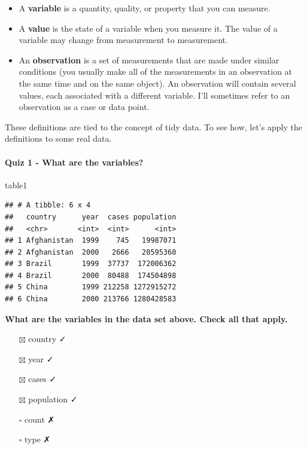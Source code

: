 \documentclass[
]{article}
\newenvironment{Shaded}{\begin{snugshade}}{\end{snugshade}}
\newcommand{\NormalTok}[1]{#1}
\providecommand{\tightlist}{%
  \setlength{\itemsep}{0pt}\setlength{\parskip}{0pt}}
\begin{document}
\begin{itemize}
\item
  A \textbf{variable} is a quantity, quality, or property that you can
  measure.
\item
  A \textbf{value} is the state of a variable when you measure it. The
  value of a variable may change from measurement to measurement.
\item
  An \textbf{observation} is a set of measurements that are made under
  similar conditions (you usually make all of the measurements in an
  observation at the same time and on the same object). An observation
  will contain several values, each associated with a different
  variable. I'll sometimes refer to an observation as a case or data
  point.
\end{itemize}

These definitions are tied to the concept of tidy data. To see how,
let's apply the definitions to some real data.

\hypertarget{quiz-1---what-are-the-variables}{%
\paragraph{Quiz 1 - What are the
variables?}\label{quiz-1---what-are-the-variables}}

\begin{Shaded}
\begin{Highlighting}[]
\NormalTok{table1}
\end{Highlighting}
\end{Shaded}

\begin{verbatim}
## # A tibble: 6 x 4
##   country      year  cases population
##   <chr>       <int>  <int>      <int>
## 1 Afghanistan  1999    745   19987071
## 2 Afghanistan  2000   2666   20595360
## 3 Brazil       1999  37737  172006362
## 4 Brazil       2000  80488  174504898
## 5 China        1999 212258 1272915272
## 6 China        2000 213766 1280428583
\end{verbatim}

\textbf{What are the variables in the data set above. Check all that
apply.}

\begin{itemize}
\tightlist
\item[$\boxtimes$]
  country ✓
\item[$\boxtimes$]
  year ✓
\item[$\boxtimes$]
  cases ✓
\item[$\boxtimes$]
  population ✓
\item[$\square$]
  count ✗
\item[$\square$]
  type ✗
\end{itemize}
\end{document}
